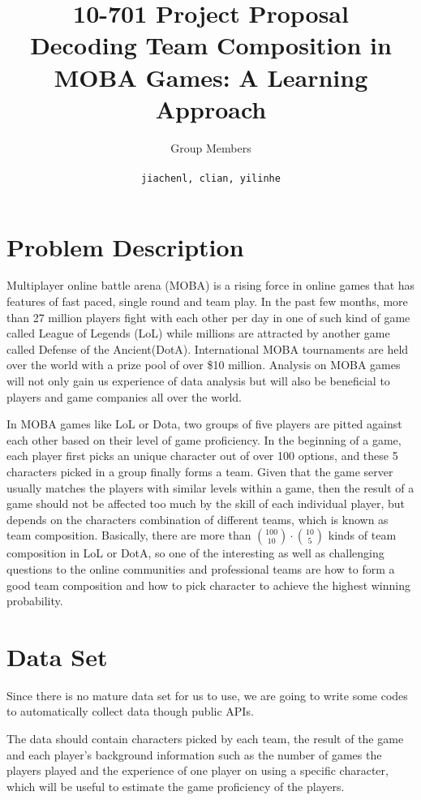 \documentclass[a4page]{article}
\author{Group Members \\ \text{Jiachen Li, Chengliang Lian, Yilin He} \\ \texttt{jiachenl, clian, yilinhe}
}
\title{10-701 Project Proposal \\ Decoding Team Composition in MOBA Games: A Learning Approach}
\date{}
\begin{document}
\maketitle


\section{Problem Description}

Multiplayer online battle arena (MOBA) is a rising force in online games that has features of fast paced, single round and team play. In the past few months, more than 27 million players fight with each other per day in one of such kind of game called League of Legends (LoL)\cite{Ian} while millions are attracted by another game called Defense of the Ancient(DotA). International MOBA tournaments are held over the world with a prize pool of over \$10 million\cite{Valve}.  Analysis on MOBA games will not only gain us experience of data analysis but will also be beneficial to players and game companies all over the world.

In MOBA games like LoL or Dota, two groups of five players are pitted against each other based on their level of game proficiency. In the beginning of a game, each player first picks an unique character out of over 100 options, and these 5 characters picked in a group finally forms a team. Given that the game server usually matches the players with similar levels within a game, then the result of a game should not be affected too much by the skill of each individual player, but depends on the characters combination of different teams, which is known as team composition. Basically, there are more than $\binom{100}{10}\cdot\binom{10}{5}$ kinds of team composition in LoL or DotA, so one of the interesting as well as challenging questions to the online communities and professional teams are how to form a good team composition and how to pick character to achieve the highest winning probability.

\section{Data Set}
Since there is no mature data set for us to use,  we are going to write some codes to automatically collect data though public APIs.

The data should contain characters picked by each team, the result of the game and each player's background information such as the number of games the players played and the experience of one player on using a specific character, which will be useful to estimate the game proficiency of the players.
\end{document}
